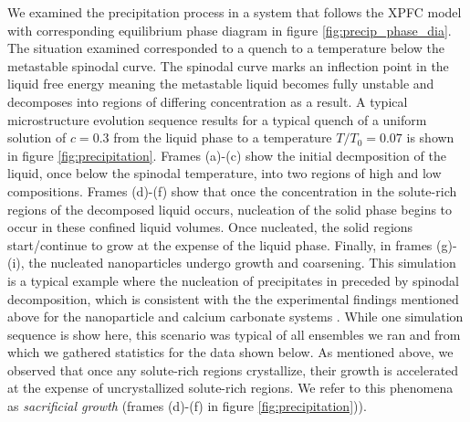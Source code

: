 \documentclass[showkeys, prb, reprint]{revtex4-1}
\begin{document}
We examined the precipitation process in a system that follows the XPFC model
with corresponding equilibrium phase diagram in figure
\ref{fig:precip_phase_dia}. The situation examined corresponded to a quench to
a temperature below the metastable spinodal curve. The spinodal curve marks an
inflection point in the liquid free energy meaning the metastable liquid
becomes fully unstable and decomposes into regions of differing concentration
as a result. A typical microstructure evolution sequence results for a typical
quench of a uniform solution of $c = 0.3$ from the liquid phase to a
temperature $T/T_0 = 0.07$ is shown in figure \ref{fig:precipitation}.
Frames (a)-(c) show the initial decmposition of the liquid, once below the
spinodal temperature, into two regions of high and low compositions. Frames
(d)-(f) show that once the concentration in the solute-rich regions of the
decomposed liquid occurs, nucleation of the solid phase begins to occur in
these confined liquid volumes. Once nucleated, the solid regions start/continue
to grow at the expense of the liquid phase. Finally, in frames (g)-(i), the
nucleated nanoparticles undergo growth and coarsening. This simulation is a
typical example where the nucleation of precipitates in preceded by spinodal
decomposition, which is consistent with the  the experimental findings
mentioned above for the nanoparticle and calcium carbonate systems \cite{LOH17,
WALLACE13}. While one simulation sequence is show here, this scenario was
typical of all ensembles we ran and from which we gathered statistics for the
data shown below. As mentioned above, we observed that once any solute-rich
regions crystallize, their growth is accelerated at the expense of
uncrystallized solute-rich regions. We refer to this phenomena as
\textit{sacrificial growth} (frames (d)-(f) in figure
\ref{fig:precipitation})). 
%
\end{document}
